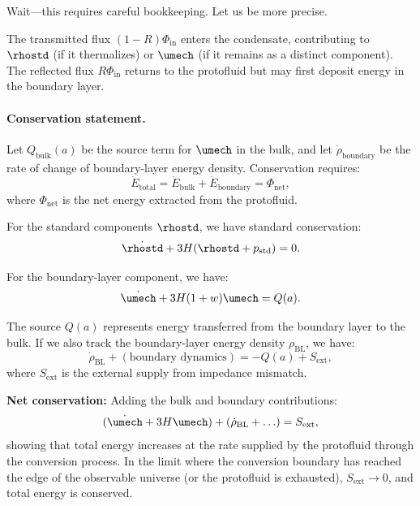 Wait---this requires careful bookkeeping. Let us be more precise.

The transmitted flux $(1-R)\Phi_{\mathrm{in}}$ enters the condensate, contributing to $\rhostd$ (if it thermalizes) or $\umech$ (if it remains as a distinct component). The reflected flux $R\Phi_{\mathrm{in}}$ returns to the protofluid but may first deposit energy in the boundary layer.

\paragraph{Conservation statement.}

Let $Q_{\mathrm{bulk}}(a)$ be the source term for $\umech$ in the bulk, and let $\dot{\rho}_{\mathrm{boundary}}$ be the rate of change of boundary-layer energy density. Conservation requires:
\begin{equation}
\dot{E}_{\mathrm{total}} = \dot{E}_{\mathrm{bulk}} + \dot{E}_{\mathrm{boundary}} = \Phi_{\mathrm{net}},
\end{equation}
where $\Phi_{\mathrm{net}}$ is the net energy extracted from the protofluid.

For the standard components $\rhostd$, we have standard conservation:
\begin{equation}
\dot{\rhostd} + 3H(\rhostd + p_{\mathrm{std}}) = 0.
\end{equation}

For the boundary-layer component, we have:
\begin{equation}
\dot{\umech} + 3H(1+w)\umech = Q(a).
\end{equation}

The source $Q(a)$ represents energy transferred from the boundary layer to the bulk. If we also track the boundary-layer energy density $\rho_{\mathrm{BL}}$, we have:
\begin{equation}
\dot{\rho}_{\mathrm{BL}} + (\text{boundary dynamics}) = -Q(a) + S_{\mathrm{ext}},
\end{equation}
where $S_{\mathrm{ext}}$ is the external supply from impedance mismatch.

\textbf{Net conservation:} Adding the bulk and boundary contributions:
\begin{equation}
(\dot{\umech} + 3H\umech) + (\dot{\rho}_{\mathrm{BL}} + \ldots) = S_{\mathrm{ext}},
\end{equation}
showing that total energy increases at the rate supplied by the protofluid through the conversion process. In the limit where the conversion boundary has reached the edge of the observable universe (or the protofluid is exhausted), $S_{\mathrm{ext}} \to 0$, and total energy is conserved.


